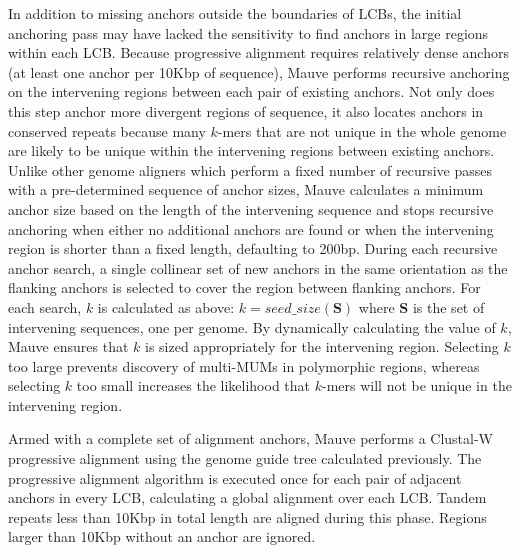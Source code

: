 \documentclass[titlepage,11pt]{article}
\begin{document}
In addition to missing anchors outside the boundaries of LCBs, the initial
anchoring pass may have lacked the sensitivity to find anchors in large regions
within each LCB.  Because progressive alignment requires relatively dense
anchors (at least one anchor per 10Kbp of sequence),  Mauve performs recursive
anchoring on the intervening regions between each pair of existing anchors.  Not only 
does this step anchor more divergent regions of sequence, it also locates anchors in
conserved repeats because many $k$-mers that are not unique in the whole genome are
likely to be unique within the intervening regions between existing anchors.
  Unlike
other genome aligners which perform a fixed number of recursive passes with a
pre-determined sequence of anchor sizes, Mauve calculates a minimum anchor size
based on the length of the intervening sequence and stops recursive anchoring
when either no additional anchors are found or when the intervening region is
shorter than a fixed length, defaulting to 200bp.  During each recursive anchor
search, a single collinear set of new anchors in the same orientation as the
flanking anchors is selected to cover the region
between flanking anchors. For each search, $k$ is calculated as above: $k =
seed\_size(\mathbf{S})$ where $\mathbf{S}$ is
the set of intervening sequences, one per genome.  By dynamically
calculating the value of $k$, Mauve ensures that $k$ is sized appropriately for
the intervening region.  Selecting $k$ too large prevents discovery of
multi-MUMs in polymorphic regions, whereas selecting $k$ too small increases
the likelihood that $k$-mers will not be unique in the intervening region.

Armed with a complete set of alignment anchors, Mauve performs a Clustal-W
progressive alignment using the genome guide tree calculated previously.  The
progressive alignment algorithm is executed once for each pair of adjacent
anchors in every LCB, calculating a global alignment over each LCB.  Tandem
repeats less than 10Kbp in total length are aligned during this phase.  Regions
larger than 10Kbp without an anchor are ignored.
\end{document}
